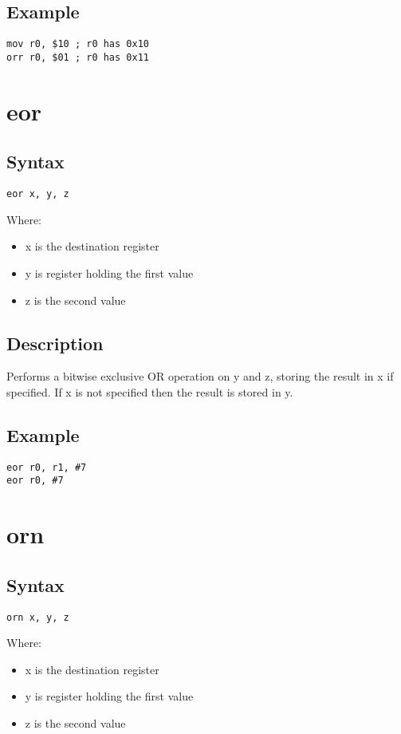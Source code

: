 \documentclass[11pt]{scrartcl}
\begin{document}
\subsection{Example}
\begin{verbatim}
mov r0, $10 ; r0 has 0x10
orr r0, $01 ; r0 has 0x11
\end{verbatim}

\section{eor}
\subsection{Syntax}
\begin{verbatim}
eor x, y, z
\end{verbatim}
Where:
\begin{itemize}
    \item x is the destination register
    \item y is register holding the first value
    \item z is the second value
\end{itemize}
\subsection{Description}
Performs a bitwise exclusive OR operation on y and z, storing the result
in x if specified. If x is not specified then the result is stored in y.
\subsection{Example}
\begin{verbatim}
eor r0, r1, #7
eor r0, #7
\end{verbatim}

\section{orn}
\subsection{Syntax}
\begin{verbatim}
orn x, y, z
\end{verbatim}
Where:
\begin{itemize}
    \item x is the destination register
    \item y is register holding the first value
    \item z is the second value
\end{itemize}
\end{document}
